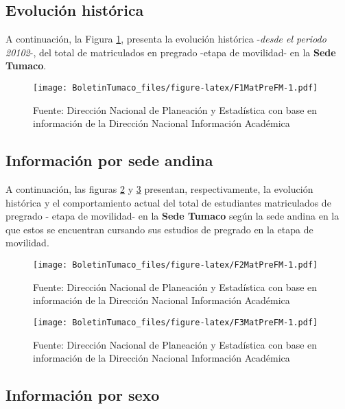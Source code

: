 \documentclass[
]{book}
\begin{document}
\hypertarget{evoluciuxf3n-histuxf3rica-4}{%
\subsection{Evolución histórica}\label{evoluciuxf3n-histuxf3rica-4}}

A continuación, la Figura \ref{fig:F1MatPreFM}, presenta la evolución histórica -\emph{desde el periodo 20102}-, del total de matriculados en pregrado -etapa de movilidad- en la \textbf{Sede Tumaco}.

\begin{figure}
\centering
\texttt{[image: BoletinTumaco\_files/figure-latex/F1MatPreFM-1.pdf]}
\caption{\label{fig:F1MatPreFM}Fuente: Dirección Nacional de Planeación y Estadística con base en información de la Dirección Nacional Información Académica}
\end{figure}

\hypertarget{informaciuxf3n-por-sede-andina-2}{%
\subsection{Información por sede andina}\label{informaciuxf3n-por-sede-andina-2}}

A continuación, las figuras \ref{fig:F2MatPreFM} y \ref{fig:F3MatPreFM} presentan, respectivamente, la evolución histórica y el comportamiento actual del total de estudiantes matriculados de pregrado - etapa de movilidad- en la \textbf{Sede Tumaco} según la sede andina en la que estos se encuentran cursando sus estudios de pregrado en la etapa de movilidad.

\begin{figure}
\centering
\texttt{[image: BoletinTumaco\_files/figure-latex/F2MatPreFM-1.pdf]}
\caption{\label{fig:F2MatPreFM}Fuente: Dirección Nacional de Planeación y Estadística con base en información de la Dirección Nacional Información Académica}
\end{figure}

\begin{figure}
\centering
\texttt{[image: BoletinTumaco\_files/figure-latex/F3MatPreFM-1.pdf]}
\caption{\label{fig:F3MatPreFM}Fuente: Dirección Nacional de Planeación y Estadística con base en información de la Dirección Nacional Información Académica}
\end{figure}

\hypertarget{informaciuxf3n-por-sexo-4}{%
\subsection{Información por sexo}\label{informaciuxf3n-por-sexo-4}}
\end{document}
